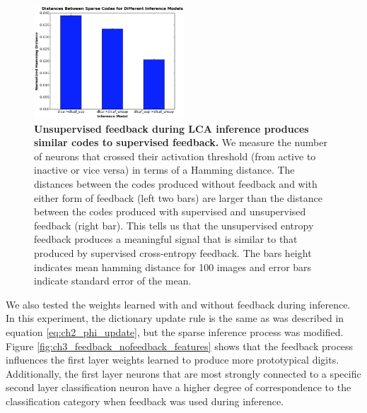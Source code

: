 \begin{figure}
    \centering
    \includegraphics[width=0.5\textwidth]{figures/feedback_code_distances.png}
    \caption{\textbf{Unsupervised feedback during LCA inference produces similar codes to supervised feedback.} We measure the number of neurons that crossed their activation threshold (from active to inactive or vice versa) in terms of a Hamming distance. The distances between the codes produced without feedback and with either form of feedback (left two bars) are larger than the distance between the codes produced with supervised and unsupervised feedback (right bar). This tells us that the unsupervised entropy feedback produces a meaningful signal that is similar to that produced by supervised cross-entropy feedback. The bars height indicates mean hamming distance for 100 images and error bars indicate standard error of the mean.}
    \label{fig:ch3_feedback_code_distances}
\end{figure}

We also tested the weights learned with and without feedback during inference. In this experiment, the dictionary update rule is the same as was described in equation \eqref{eq:ch2_phi_update}, but the sparse inference process was modified. Figure \ref{fig:ch3_feedback_nofeedback_features} shows that the feedback process influences the first layer weights learned to produce more prototypical digits. Additionally, the first layer neurons that are most strongly connected to a specific second layer classification neuron have a higher degree of correspondence to the classification category when feedback was used during inference.

